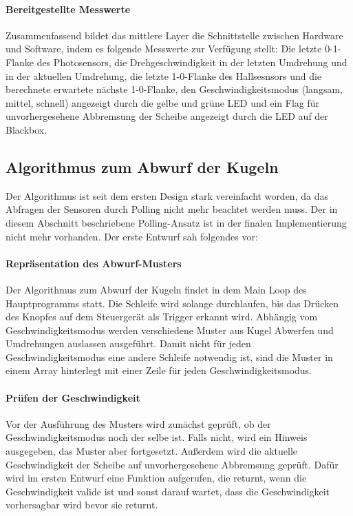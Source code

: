 \documentclass{kis}
\begin{document}
\paragraph{Bereitgestellte Messwerte}
Zusammenfassend bildet das mittlere Layer die Schnittstelle zwischen Hardware und Software, indem es folgende Messwerte zur Verfügung stellt: Die letzte 0-1-Flanke des Photosensors, die Drehgeschwindigkeit in der letzten Umdrehung und in der aktuellen Umdrehung, die letzte 1-0-Flanke des Hallsesnsors und die berechnete erwartete nächste 1-0-Flanke, den Geschwindigkeitsmodus (langsam, mittel, schnell) angezeigt durch die gelbe und grüne LED und ein Flag für unvorhergesehene Abbremsung der Scheibe angezeigt durch die LED auf der Blackbox.


\subsection{Algorithmus zum Abwurf der Kugeln}

Der Algorithmus ist seit dem ersten Design stark vereinfacht worden, da das Abfragen der Sensoren durch Polling nicht mehr beachtet werden muss. Der in diesem Abschnitt beschriebene Polling-Ansatz ist in der finalen Implementierung nicht mehr vorhanden. Der erste Entwurf sah folgendes vor:

\paragraph{Repräsentation des Abwurf-Musters}
Der Algorithmus zum Abwurf der Kugeln findet in dem Main Loop des Hauptprogramms statt. Die Schleife wird solange durchlaufen, bis das Drücken des Knopfes auf dem Steuergerät als Trigger erkannt wird. Abhängig vom Geschwindigkeitsmodus werden verschiedene Muster aus Kugel Abwerfen und Umdrehungen auslassen ausgeführt. Damit nicht für jeden Geschwindigkeitsmodus eine andere Schleife notwendig ist, sind die Muster in einem Array hinterlegt mit einer Zeile für jeden Geschwindigkeitsmodus. 

\paragraph{Prüfen der Geschwindigkeit}
Vor der Ausführung des Musters wird zunächst geprüft, ob der Geschwindigkeitsmodus noch der selbe ist. Falls nicht, wird ein Hinweis ausgegeben, das Muster aber fortgesetzt. Außerdem wird die aktuelle Geschwindigkeit der Scheibe auf unvorhergesehene Abbremsung geprüft. Dafür wird im ersten Entwurf eine Funktion aufgerufen, die returnt, wenn die Geschwindigkeit valide ist und sonst darauf wartet, dass die Geschwindigkeit vorhersagbar wird bevor sie returnt.
\end{document}
